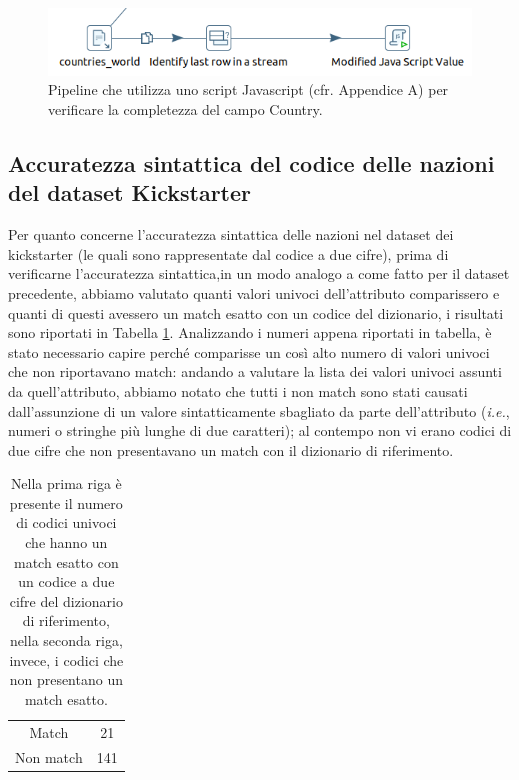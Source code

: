 \begin{figure}
	\centering
	\includegraphics[width=0.7\linewidth]{images/DQ_completezzacountry}
	\caption{Pipeline che utilizza uno script Javascript (cfr. Appendice A) per verificare la completezza del campo Country.}
	\label{fig:dqcompletezzacountry}
\end{figure}


\subsection{Accuratezza sintattica del codice delle nazioni del dataset Kickstarter}
Per quanto concerne l'accuratezza sintattica delle nazioni nel dataset dei kickstarter (le quali sono rappresentate dal codice a due cifre), prima di verificarne l'accuratezza sintattica,in un modo analogo a come fatto per il dataset precedente, abbiamo valutato quanti valori univoci dell'attributo comparissero e quanti di questi avessero un match esatto con un codice del dizionario, i risultati sono riportati in Tabella \ref{tab:unique_code_country}.
Analizzando i numeri appena riportati in tabella, è stato necessario capire perché comparisse un così alto numero di valori univoci che non riportavano match: andando a valutare la lista dei valori univoci assunti da quell'attributo, abbiamo notato che tutti i non match sono stati causati dall'assunzione di un valore sintatticamente sbagliato da parte dell'attributo (\textit{i.e.}, numeri o stringhe più lunghe di due caratteri); al contempo non vi erano codici di due cifre che non presentavano un match con il dizionario di riferimento.

\begin{table}
	\caption{Nella prima riga è presente il numero di codici univoci che hanno un match esatto con un codice a due cifre del dizionario di riferimento, nella seconda riga, invece, i codici che non presentano un match esatto.}
	
	\label{tab:unique_code_country}
	
	\centering
	\begin{tabular}{c|c}
		Match & 21\\ 
		Non match & 141 \\
	\end{tabular}
\end{table} 

